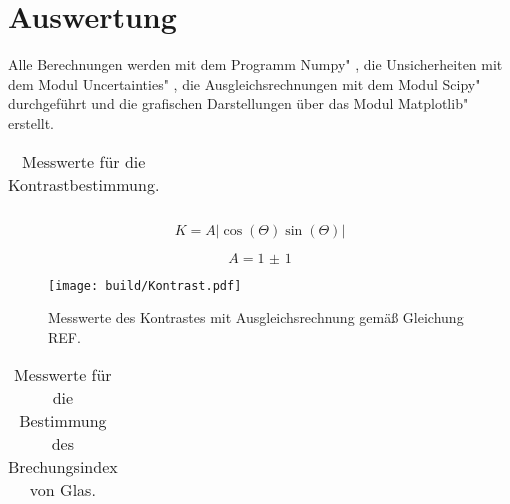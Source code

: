 \section{Auswertung}
\label{sec:Auswertung}
Alle Berechnungen werden mit dem Programm \glqq Numpy" \cite{numpy}, die Unsicherheiten mit dem Modul \glqq Uncertainties" \cite{uncertainties}, die Ausgleichsrechnungen mit dem Modul \glqq Scipy" \cite{scipy} durchgeführt und die grafischen Darstellungen über das Modul \glqq Matplotlib" \cite{matplotlib} erstellt.


\begin{table}
    \centering
    \caption{Messwerte für die Kontrastbestimmung. }
    \label{tab:kontrast}
    \begin{tabular}{S S S S}
        \toprule

        \midrule

        \bottomrule

    \end{tabular}
\end{table}

\begin{equation}
    K = A \lvert{\cos(\Theta)\sin(\Theta)}\rvert
\end{equation}

\begin{equation}
    A = \num{1(1)}
\end{equation}

\begin{figure}
    \texttt{[image: build/Kontrast.pdf]}
    \caption{Messwerte des Kontrastes mit Ausgleichsrechnung gemäß Gleichung REF.}
    \label{plot1}
\end{figure}

\begin{table}
    \centering
    \caption{Messwerte für die Bestimmung des Brechungsindex von Glas. }
    \label{tab:glas}
    \begin{tabular}{S S S}
        \toprule

        \midrule

        \bottomrule

    \end{tabular}
\end{table}


